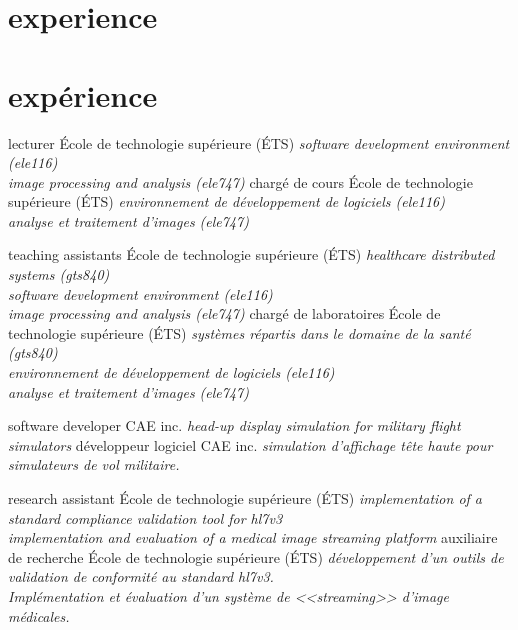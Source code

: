 \documentclass[print]{friggeri-cv}
\begin{document}
\ifdefined\isenglish\section{experience}\else\section{expérience}\fi

\begin{entrylist}
  \ifdefined\isenglish
     {lecturer} {École de technologie supérieure {\scriptsize (ÉTS)}} {\emph{software development environment (ele{\footnotesize116})\\image processing and analysis (ele{\footnotesize747})}}
  \else
     {chargé de cours} {École de technologie supérieure {\scriptsize (ÉTS)}} {\emph{environnement de développement de logiciels (ele{\footnotesize116})\\analyse et traitement d'images (ele{\footnotesize747})}}
  \fi

  \ifdefined\isenglish
     {teaching assistants} {École de technologie supérieure {\scriptsize (ÉTS)}} {\emph{healthcare distributed systems (gts{\footnotesize840})\\software development environment (ele{\footnotesize116})\\image processing and analysis (ele{\footnotesize747})}}
  \else
     {chargé de laboratoires} {École de technologie supérieure {\scriptsize (ÉTS)}} {\emph{systèmes répartis dans le domaine de la santé (gts{\footnotesize840})\\environnement de développement de logiciels (ele{\footnotesize116})\\analyse et traitement d'images (ele{\footnotesize747})}}
  \fi

  \ifdefined\isenglish
     {software developer} {\scriptsize{CAE} inc.} {\emph{head-up display simulation for military flight simulators}}
  \else
     {développeur logiciel} {\scriptsize{CAE} inc.} {\emph{simulation d'affichage tête haute pour simulateurs de vol militaire.}}
  \fi

  \ifdefined\isenglish
     {research assistant} {École de technologie supérieure {\scriptsize (ÉTS)}} {\emph{implementation of a standard compliance validation tool for hl{\small7}v{\small3}\\implementation and evaluation of a medical image streaming platform}}
  \else
     {auxiliaire de recherche} {École de technologie supérieure {\scriptsize (ÉTS)}} {\emph{développement d'un outils de validation de conformité au standard hl{\small7}v{\small3}.\\Implémentation et évaluation d'un système de <<streaming>> d'image médicales.}}
  \fi
\end{entrylist}
\end{document}
